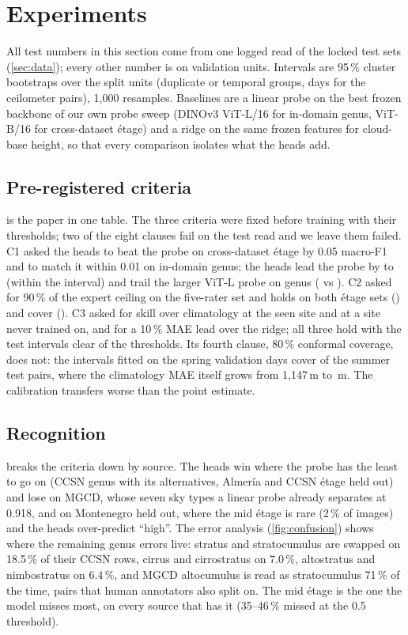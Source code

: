 \section{Experiments}
\label{sec:experiments}

All test numbers in this section come from one logged read of the locked test sets (\cref{sec:data}); every
other number is on validation units. Intervals are 95\,\% cluster bootstraps over the split units (duplicate or
temporal groups, days for the ceilometer pairs), 1,000 resamples. Baselines are a linear probe on the best frozen
backbone of our own probe sweep (DINOv3 ViT-L/16 for in-domain genus, ViT-B/16 for cross-dataset \'etage) and a
ridge on the same frozen features for cloud-base height, so that every comparison isolates what the heads add.

\subsection{Pre-registered criteria}

 is the paper in one table. The three criteria were fixed before training with their
thresholds; two of the eight clauses fail on the test read and we leave them failed. C1 asked the heads to beat the
probe on cross-dataset \'etage by 0.05 macro-F1 and to match it within 0.01 on in-domain genus; the heads lead the
probe by \nLodoModel{} to \nLodoProbe{} (within the interval) and trail the larger ViT-L probe on genus
(\nIndGenusModel{} vs \nIndGenusProbe{}). C2 asked for 90\,\% of the expert ceiling on the five-rater set and holds
on both \'etage sets (\nCtwoEtage{}) and cover (\nCtwoOktas{}). C3 asked for skill over climatology at the seen site
and at a site never trained on, and for a 10\,\% MAE lead over the ridge; all three hold with the test intervals
clear of the thresholds. Its fourth clause, 80\,\% conformal coverage, does not: the intervals fitted on the spring
validation days cover \nCovEighty{} of the summer test pairs, where the climatology MAE itself grows from 1,147\,m
to \nMaeClim{}\,m. The calibration transfers worse than the point estimate.

\subsection{Recognition}

 breaks the criteria down by source. The heads win where the probe has the least to go on
(CCSN genus with its alternatives, Almer\'ia and CCSN \'etage held out) and lose on MGCD, whose seven sky types a
linear probe already separates at 0.918, and on Montenegro held out, where the mid \'etage is rare (2\,\% of
images) and the heads over-predict ``high''. The error analysis (\cref{fig:confusion}) shows where the remaining
genus errors live: stratus and stratocumulus are swapped on 18.5\,\% of their CCSN rows, cirrus and cirrostratus
on 7.0\,\%, altostratus and nimbostratus on 6.4\,\%, and MGCD altocumulus is read as stratocumulus 71\,\% of the
time, pairs that human annotators also split on. The mid \'etage is the one the model misses most, on every source
that has it (35--46\,\% missed at the 0.5 threshold).

